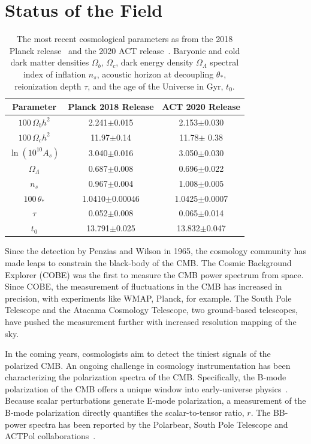 \section{Status of the Field}
\begin{table}[b!]
    \centering
    \begin{tabular}{|c|c|c|}\hline 
         Parameter & Planck 2018 Release & ACT 2020 Release \\ \hline
         $100\,\Omega_b h^2$ &  2.241$\pm$0.015 &2.153$\pm$0.030 \\
         $100\,\Omega_c h^2$ & 11.97$\pm$0.14 & 11.78$\pm$ 0.38\\
         $\ln(10^{10}A_s)$ &3.040$\pm$0.016& 3.050$\pm$0.030\\
         $\Omega_\Lambda$ & 0.687$\pm$0.008 & 0.696$\pm$0.022\\
         $n_{s}$ & 0.967$\pm$0.004 & 1.008$\pm$0.005\\
         $100\,\theta_{*}$ & 1.0410$\pm$0.00046 &1.0425$\pm$0.0007 \\
         $\tau$  &0.052$\pm$0.008 &0.065$\pm$0.014 \\
         $t_0$& 13.791$\pm$0.025 & 13.832$\pm$0.047\\
         \hline
    \end{tabular}
    \caption{The most recent cosmological parameters as from the 2018 Planck release~\cite{planck2020} and the 2020 ACT release~\cite{aiola_2020}.  Baryonic and cold dark matter densities $\Omega_b$, $\Omega_c$, dark energy density $\Omega_\Lambda$ spectral index of inflation $n_{s}$, acoustic horizon at decoupling $\theta_*$, reionization depth $\tau$, and the age of the Universe in Gyr, $t_0$.}
    \label{tab:cosmology_recent_results}
\end{table}

Since the detection by Penzias and Wilson in 1965, the cosmology community has made leaps to constrain the black-body of the CMB.  The Cosmic Background Explorer (COBE) was the first to measure the CMB power spectrum from space.  Since COBE, the measurement of fluctuations in the CMB has increased in precision, with experiments like WMAP, Planck, for example.  The South Pole Telescope and the Atacama Cosmology Telescope, two ground-based telescopes, have pushed the measurement further with increased resolution mapping of the sky.

In the coming years, cosmologists aim to detect the tiniest signals of the polarized CMB.  An ongoing challenge in cosmology instrumentation has been characterizing the polarization spectra of the CMB.  Specifically, the B-mode polarization of the CMB offers a unique window into early-universe physics~\cite{weinberg_cosmo}.  Because scalar perturbations generate E-mode polarization, a measurement of the B-mode polarization directly quantifies the scalar-to-tensor ratio, $r$.  The BB-power spectra has been reported by the Polarbear, South Pole Telescope and ACTPol collaborations~\cite{planck_data,choi_2020,PARAde_2014}.

